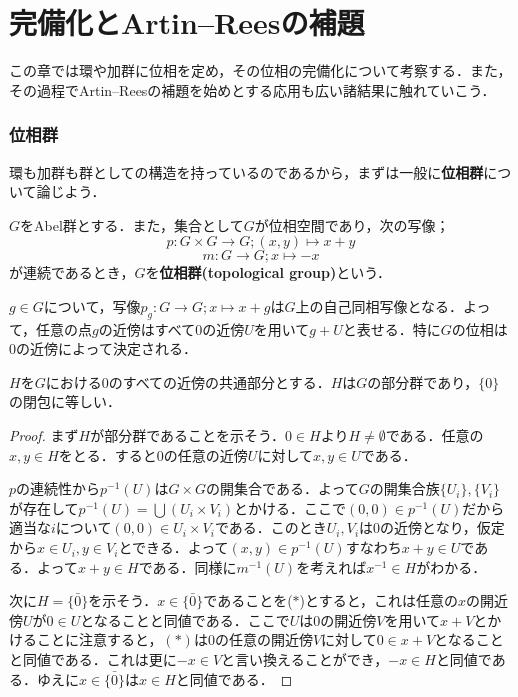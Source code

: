 \part[Completion and Artin--Rees lemma]{完備化とArtin--Reesの補題}

この章では環や加群に位相を定め，その位相の完備化について考察する．また，その過程でArtin--Reesの補題を始めとする応用も広い諸結果に触れていこう．%
\section{位相群}
環も加群も群としての構造を持っているのであるから，まずは一般に\textbf{位相群}について論じよう．
\begin{defi}[位相群]
	$G$をAbel群とする．また，集合として$G$が位相空間であり，次の写像；
	\[p:G\times G\to G;(x,y)\mapsto x+y\]
	\[m:G\to G;x\mapsto -x\]
	が連続であるとき，$G$を\textbf{位相群(topological group)}という．
\end{defi}

$g\in G$について，写像$p_g:G\to G;x\mapsto x+g$は$G$上の自己同相写像となる．よって，任意の点$g$の近傍はすべて$0$の近傍$U$を用いて$g+U$と表せる．特に$G$の位相は$0$の近傍によって決定される．

\begin{prop}
	$H$を$G$における$0$のすべての近傍の共通部分とする．$H$は$G$の部分群であり，$\{0\}$の閉包に等しい．
\end{prop}

\begin{proof}
	まず$H$が部分群であることを示そう．$0\in H$より$H\neq\emptyset$である．任意の$x,y\in H$をとる．すると$0$の任意の近傍$U$に対して$x,y\in U$である．
	
	$p$の連続性から$p^{-1}(U)$は$G\times G$の開集合である．よって$G$の開集合族$\{U_i\},\{V_i\}$が存在して$p^{-1}(U)=\bigcup (U_i\times V_i)$とかける．ここで$(0,0)\in p^{-1}(U)$だから適当な$i$について$(0,0)\in U_i\times V_i$である．このとき$U_i,V_i$は$0$の近傍となり，仮定から$x\in U_i,y\in V_i$とできる．よって$(x,y)\in p^{-1}(U)$すなわち$x+y\in U$である．よって$x+y\in H$である．同様に$m^{-1}(U)$を考えれば$x^{-1}\in H$がわかる．
	
	次に$H=\bar{\{0\}}$を示そう．$x\in\bar{\{0\}}$であることを($\ast$)とすると，これは任意の$x$の開近傍$U$が$0\in U$となることと同値である．ここで$U$は$0$の開近傍$V$を用いて$x+V$とかけることに注意すると，$(\ast)$は$0$の任意の開近傍$V$に対して$0\in x+V$となることと同値である．これは更に$-x\in V$と言い換えることができ，$-x\in H$と同値である．ゆえに$x\in\bar{\{0\}}$は$x\in H$と同値である．
\end{proof}

